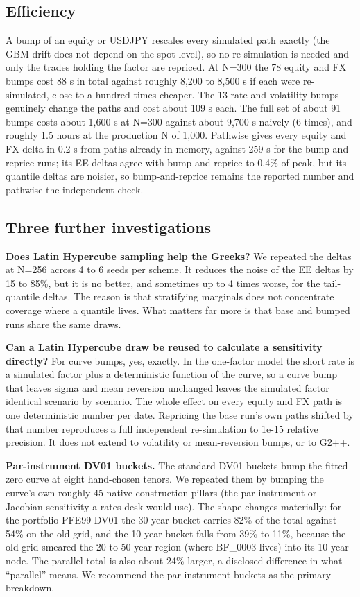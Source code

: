 \documentclass[11pt,letterpaper]{article}
\begin{document}
\subsection{Efficiency}
A bump of an equity or USDJPY rescales every simulated path exactly (the GBM drift does not depend on the spot level), so no re-simulation is needed and only the trades holding the factor are repriced. At N=300 the 78 equity and FX bumps cost 88 s in total against roughly 8,200 to 8,500 s if each were re-simulated, close to a hundred times cheaper. The 13 rate and volatility bumps genuinely change the paths and cost about 109 s each. The full set of about 91 bumps costs about 1,600 s at N=300 against about 9,700 s naively (6 times), and roughly 1.5 hours at the production N of 1,000. Pathwise gives every equity and FX delta in 0.2 s from paths already in memory, against 259 s for the bump-and-reprice runs; its EE deltas agree with bump-and-reprice to 0.4\% of peak, but its quantile deltas are noisier, so bump-and-reprice remains the reported number and pathwise the independent check.

\subsection{Three further investigations}
\textbf{Does Latin Hypercube sampling help the Greeks?} We repeated the deltas at N=256 across 4 to 6 seeds per scheme. It reduces the noise of the EE deltas by 15 to 85\%, but it is no better, and sometimes up to 4 times worse, for the tail-quantile deltas. The reason is that stratifying marginals does not concentrate coverage where a quantile lives. What matters far more is that base and bumped runs share the same draws.

\textbf{Can a Latin Hypercube draw be reused to calculate a sensitivity directly?} For curve bumps, yes, exactly. In the one-factor model the short rate is a simulated factor plus a deterministic function of the curve, so a curve bump that leaves sigma and mean reversion unchanged leaves the simulated factor identical scenario by scenario. The whole effect on every equity and FX path is one deterministic number per date. Repricing the base run's own paths shifted by that number reproduces a full independent re-simulation to 1e-15 relative precision. It does not extend to volatility or mean-reversion bumps, or to G2++.

\textbf{Par-instrument DV01 buckets.} The standard DV01 buckets bump the fitted zero curve at eight hand-chosen tenors. We repeated them by bumping the curve's own roughly 45 native construction pillars (the par-instrument or Jacobian sensitivity a rates desk would use). The shape changes materially: for the portfolio PFE99 DV01 the 30-year bucket carries 82\% of the total against 54\% on the old grid, and the 10-year bucket falls from 39\% to 11\%, because the old grid smeared the 20-to-50-year region (where BF\_0003 lives) into its 10-year node. The parallel total is also about 24\% larger, a disclosed difference in what ``parallel'' means. We recommend the par-instrument buckets as the primary breakdown.
\end{document}
